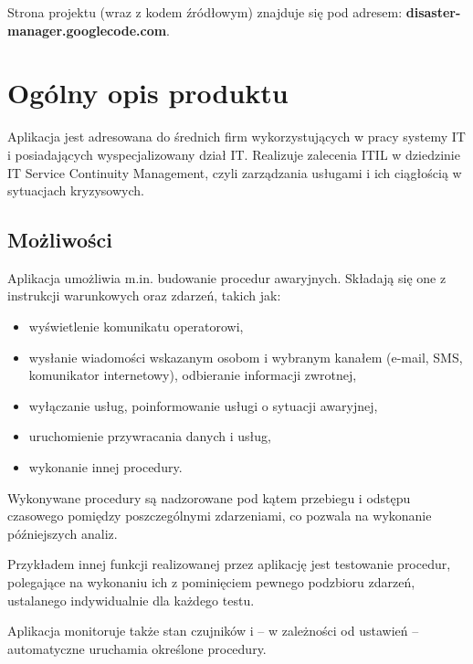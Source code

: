 \documentclass[a4paper,12pt]{article}
\begin{document}
Strona projektu (wraz z kodem źródłowym) znajduje się pod adresem: \textbf{disaster-manager.googlecode.com}.


\section{Ogólny opis produktu}

Aplikacja jest adresowana do średnich firm wykorzystujących w pracy systemy IT i posiadających
wyspecjalizowany dział IT. Realizuje zalecenia ITIL w dziedzinie IT Service Continuity Management,
czyli zarządzania usługami i ich ciągłością w sytuacjach kryzysowych.

\subsection{Możliwości}

Aplikacja umożliwia m.in. budowanie procedur awaryjnych. Składają się one z instrukcji warunkowych oraz zdarzeń, takich jak:

\begin{itemize}

	\item wyświetlenie komunikatu operatorowi,

	\item wysłanie wiadomości wskazanym osobom i wybranym kanałem (e-mail, SMS, komunikator internetowy),
	odbieranie informacji zwrotnej,

	\item wyłączanie usług, poinformowanie usługi o sytuacji awaryjnej,

	\item uruchomienie przywracania danych i usług,

	\item wykonanie innej procedury.

\end{itemize}

Wykonywane procedury są nadzorowane pod kątem przebiegu i odstępu czasowego pomiędzy
poszczególnymi zdarzeniami, co pozwala na wykonanie późniejszych analiz.

Przykładem innej funkcji realizowanej przez aplikację jest testowanie procedur, polegające
na wykonaniu ich z pominięciem pewnego podzbioru zdarzeń, ustalanego indywidualnie dla każdego testu.

Aplikacja monitoruje także stan czujników i -- w zależności od ustawień -- automatyczne
uruchamia określone procedury.
\end{document}
